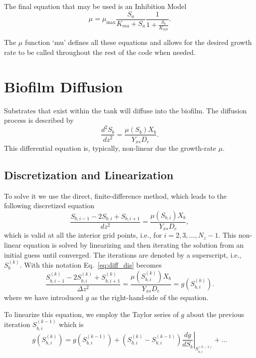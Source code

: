 \documentclass[letterpaper, twoside]{article}
\numberwithin{equation}{section}
\newcommand{\ie}{i.e.}
\begin{document}
The final equation that may be used is an Inhibition Model
\begin{equation} \label{eq: Inhibition}
  \mu=\mu_\mathrm{max} \frac{S_a}{K_{ma} + S_a} \frac{1}{1 + \frac{S_b}{K_{mb}}}.
\end{equation}

The $\mu$ function `mu' defines all these equations and allows for the desired growth rate to be called throughout the rest of the code when needed.
  

\section{Biofilm Diffusion}
Substrates that exist within the tank will diffuse into the biofilm.  The diffusion process is described by
\begin{equation} \label{eq:diffusion}
  \frac{d^2 S_b}{dz^2} = \frac{\mu(S_b) X_b}{Y_{xs} D_e}.
\end{equation}
This differential equation is, typically, non-linear due the growth-rate $\mu$.

\subsection{Discretization and Linearization}
To solve it we use the direct, finite-difference method, which leads to the following discretized equation
\begin{equation} \label{eq:diff_dis}
  \frac{ S_{b,i-1} - 2 S_{b,i} + S_{b,i+1}}{dz^2} = \frac{\mu(S_{b,i}) X_b}{Y_{xs} D_e},
\end{equation}
which is valid at all the interior grid points, \ie, for $i=2,3,\dots,N_z-1$. 
This non-linear equation is solved by linearizing and then iterating the solution from an initial guess until converged.
The iterations are denoted by a superscript, \ie, $S_{b}^{(k)}$.  With this notation Eq.~\ref{eq:diff_dis} becomes
\begin{equation} \label{eq:diff_dis_iter}
  \frac{ S_{b,i-1}^{(k)} - 2 S_{b,i}^{(k)} + S_{b,i+1}^{(k)}}{\Delta z^2} = \frac{\mu\left(S_{b,i}^{(k)}\right) X_b}{Y_{xs} D_e} =  g\left(S_{b,i}^{(k)}\right).
\end{equation}
where we have introduced $g$ as the right-hand-side of the equation.

To linearize this equation, we employ the Taylor series of $g$ about the previous iteration $S_{b,i}^{(k-1)}$ which is
\begin{equation}\label{eq:TaylorSeries}
  g\left(S_{b,i}^{(k)}\right) =   g\left(S_{b,i}^{(k-1)}\right) + \left( S_{b,i}^{(k)} - S_{b,i}^{(k-1)}\right) \left.\frac{d g}{d S_b}\right|_{S_{b,i}^{(k-1)}} + \dots
\end{equation}
\end{document}
